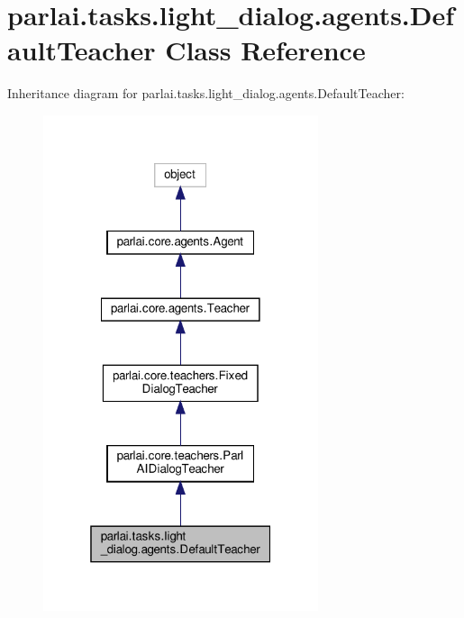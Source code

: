 \hypertarget{classparlai_1_1tasks_1_1light__dialog_1_1agents_1_1DefaultTeacher}{}\section{parlai.\+tasks.\+light\+\_\+dialog.\+agents.\+Default\+Teacher Class Reference}
\label{classparlai_1_1tasks_1_1light__dialog_1_1agents_1_1DefaultTeacher}


Inheritance diagram for parlai.\+tasks.\+light\+\_\+dialog.\+agents.\+Default\+Teacher\+:
\nopagebreak
\begin{figure}[H]
\begin{center}
\leavevmode
\includegraphics[width=229pt]{classparlai_1_1tasks_1_1light__dialog_1_1agents_1_1DefaultTeacher__inherit__graph}
\end{center}
\end{figure}


